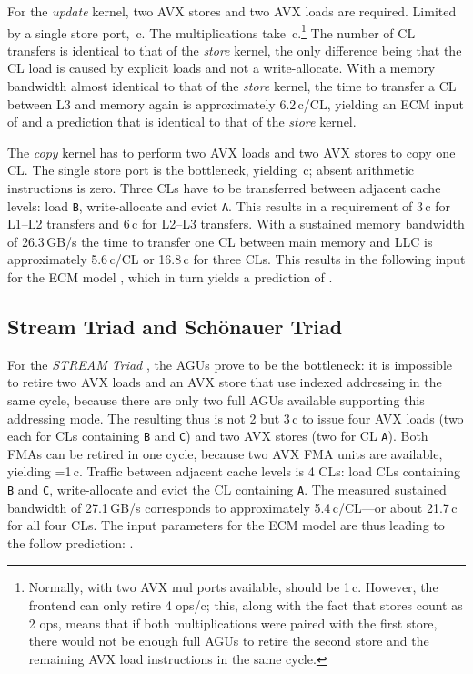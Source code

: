 \documentclass{llncs}
\newcommand{\ecm}[6]{\mbox{}}
\newcommand{\ecmp}[5]{\mbox{}}
\begin{document}
For the \textit{update} kernel, two AVX stores and two AVX loads are required.
Limited by a single store port, \,c.  The multiplications
take \,c.\footnote{Normally, with two AVX mul ports
available,  should be 1\,c. However, the frontend can only
retire 4 ops/c; this, along with the fact that stores count as 2 ops,
means that if both multiplications were paired with the first store, there
would not be enough full AGUs to retire the second store and the remaining AVX
load instructions in the same cycle.} The number of CL transfers is
identical to that of the \textit{store} kernel, the only difference being that
the CL load is caused by explicit loads and not a write-allocate. With a memory
bandwidth almost identical to that of the \textit{store} kernel, the time to
transfer a CL between L3 and memory again is approximately 6.2\,c/CL, yielding
an ECM input of \ecm{2}{2}{2}{4}{12.5}{\mathrm{c}} and a prediction that
is identical to that of the \textit{store} kernel.

The \textit{copy} kernel has to perform two AVX loads and two AVX stores to
copy one CL. The single store port is the bottleneck, yielding
\,c; absent arithmetic instructions  is zero.
Three CLs have to be transferred between adjacent cache levels: load
\texttt{B}, write-allocate and evict \texttt{A}. This results in a requirement
of 3\,c for L1--L2 transfers and 6\,c for L2--L3 transfers.  With a sustained
memory bandwidth of 26.3\,GB/s the time to transfer one CL between main memory
and \ac{LLC} is approximately 5.6\,c/CL or 16.8\,c for three CLs.  This results
in the following input for the ECM model \ecm{0}{2}{3}{6}{16.8}{\mathrm{c}},
which in turn yields a prediction of \ecmp{2}{5}{11}{27.8}{\mathrm{c}}.

\subsection{Stream Triad and Sch\"onauer Triad}

For the \textit{STREAM Triad} \cite{McCalpin:1995}, the \ac{AGU}s prove to be
the bottleneck: it is impossible to retire two AVX loads and an AVX store that
use indexed addressing in the same cycle, because there are only two full
\ac{AGU}s available supporting this addressing mode.  The resulting
 thus is not 2 but 3\,c to issue four AVX loads (two each for
CLs containing \texttt{B} and \texttt{C}) and two AVX stores (two for CL
\texttt{A}). Both \ac{FMA}s can be retired in one cycle, because two \ac{AVX}
\ac{FMA} units are available, yielding =1\,c. Traffic between
adjacent cache levels is 4 CLs: load CLs containing \texttt{B} and \texttt{C},
write-allocate and evict the CL containing \texttt{A}. The measured sustained
bandwidth of 27.1\,GB/s corresponds to approximately 5.4\,c/CL---or about
21.7\,c for all four CLs.  The input parameters for the ECM model are thus
\ecm{1}{3}{4}{8}{21.7}{\mathrm{c}} leading to the follow prediction:
\ecmp{3}{7}{15}{36.7}{\mathrm{c}}.
\end{document}
